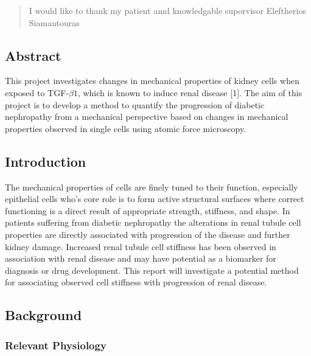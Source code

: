 \documentclass[
  paper=a4,
  ,captions=tableheading
]{scrartcl}
\begin{document}
\begin{abstract}
\begin{justify}
I would like to thank my patient amd knowledgable suporvisor Eleftherios
Siamantouras
\end{justify}
\end{abstract}
\pagebreak


\setcounter{page}{0} %



\renewcommand*\contentsname{}
\renewcommand*\contentsname{Table of Contents}
{
\setcounter{tocdepth}{3}
\tableofcontents
\newpage
}
\subsection{Abstract}\label{abstract}

This project investigates changes in mechanical properties of kidney
cells when exposed to TGF-\(\beta 1\), which is known to induce renal
disease {[}1{]}. The aim of this project is to develop a method to
quantify the progression of diabetic nephropathy from a mechanical
perspective based on changes in mechanical properties observed in single
cells using atomic force microscopy.

\subsection{Introduction}\label{introduction}

The mechanical properties of cells are finely tuned to their function,
especially epithelial cells who's core role is to form active structural
surfaces where correct functioning is a direct result of appropriate
strength, stiffness, and shape. In patients suffering from diabetic
nephropathy the alterations in renal tubule cell properties are directly
associated with progression of the disease and further kidney damage.
Increased renal tubule cell stiffness has been observed in association
with renal disease and may have potential as a biomarker for diagnosis
or drug development. This report will investigate a potential method for
associating observed cell stiffness with progression of renal disease.

\subsection{Background}\label{background}

\subsubsection{Relevant Physiology}\label{relevant-physiology}
\end{document}
